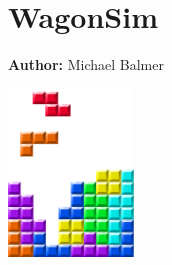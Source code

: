 \chapter{WagonSim }
\label{ch:wagonSim}

\hfill \textbf{Author:} Michael Balmer

\begin{center} \includegraphics[width=0.25\textwidth, angle=0]{figures/matsimBook.png} \end{center}

